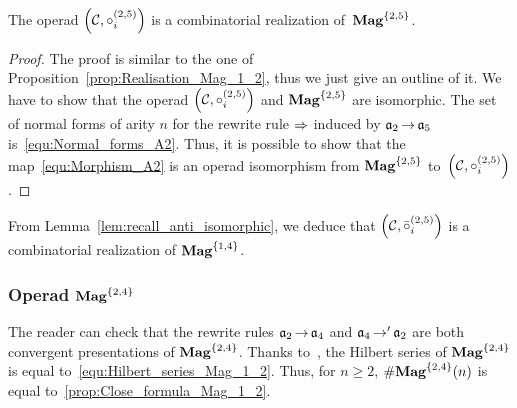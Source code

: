 \begin{Proposition} \label{prop:Realisation_Mag_1_4}
    The operad $\left(\mathcal{C}, \circ_i^{(2,5)}\right)$ is a
    combinatorial realization of~$\mathbf{Mag}^{\{2, 5\}}$.
\end{Proposition}
\begin{proof}
    The proof is similar to the one of
    Proposition~\ref{prop:Realisation_Mag_1_2}, thus we just give an
    outline of it.
    We have to show that the operad
    $\left(\mathcal{C}, \circ_i^{(2,5)}\right)$ and $\mathbf{Mag}^{\{2, 5\}}$
    are isomorphic. The set of normal forms of arity $n$ for the
    rewrite rule $\operatorname{\Rightarrow}$ induced by $\mathfrak{a}_2 \operatorname{\to} \mathfrak{a}_5$
    is~\eqref{equ:Normal_forms_A2}. Thus, it is possible to show that
    the map~\eqref{equ:Morphism_A2} is an operad isomorphism from
    $\mathbf{Mag}^{\{2, 5\}}$ to~$\left(\mathcal{C}, \circ_i^{(2,5)}\right)$.
\end{proof}
\medbreak

From Lemma~\ref{lem:recall_anti_isomorphic}, we deduce that
$\left(\mathcal{C}, \bar{\circ}_i^{(2,5)}\right)$ is a combinatorial
realization of $\mathbf{Mag}^{\{1, 4\}}$.
\medbreak

\subsubsection{Operad $\mathbf{Mag}^{\{2, 4\}}$}
The reader can check that the rewrite rules $\mathfrak{a}_2 \operatorname{\to} \mathfrak{a}_4$ and
$\mathfrak{a}_4 \operatorname{\to}' \mathfrak{a}_2$ are both convergent presentations of
$\mathbf{Mag}^{\{2, 4\}}$.
Thanks to~\cite{Gir18}, the Hilbert series of $\mathbf{Mag}^{\{2, 4\}}$
is equal to~\eqref{equ:Hilbert_series_Mag_1_2}. Thus, for $n \geq 2$,
$\# \mathbf{Mag}^{\{2, 4\}}(n)$ is equal to~\eqref{prop:Close_formula_Mag_1_2}.
\medbreak

